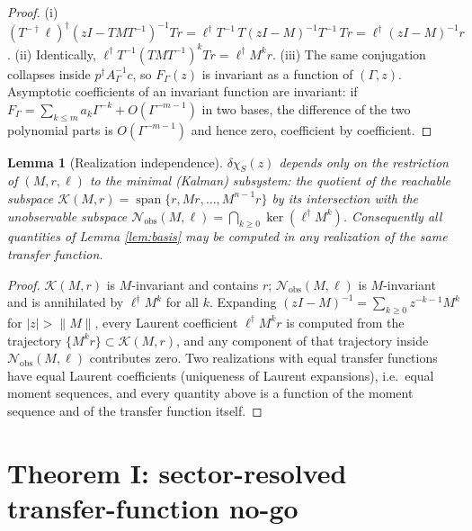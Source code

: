 \documentclass[11pt]{article}
\newtheorem{lemma}{Lemma}
\newcommand{\spann}{\operatorname{span}}
\newcommand{\kry}{\mathcal K}
\newcommand{\nobs}{\mathcal N_{\mathrm{obs}}}
\begin{document}
\begin{proof}
(i) $(T^{-\dagger}\ell)^\dagger(zI-TMT^{-1})^{-1}Tr
=\ell^\dagger T^{-1}\,T(zI-M)^{-1}T^{-1}\,Tr=\ell^\dagger(zI-M)^{-1}r$.
(ii) Identically, $\ell^\dagger T^{-1}(TMT^{-1})^kTr=\ell^\dagger M^kr$.
(iii) The same conjugation collapses inside
$p^\dagger A_\Gamma^{-1}c$, so $F_\Gamma(z)$ is invariant as a function of
$(\Gamma,z)$. Asymptotic coefficients of an invariant function are invariant:
if $F_\Gamma=\sum_{k\le m}a_k\Gamma^{-k}+O(\Gamma^{-m-1})$ in two bases, the
difference of the two polynomial parts is $O(\Gamma^{-m-1})$ and hence zero,
coefficient by coefficient.
\end{proof}

\begin{lemma}[Realization independence]
\label{lem:kalman}
$\delta\chi_S(z)$ depends only on the restriction of $(M,r,\ell)$ to the
\emph{minimal} (Kalman) subsystem: the quotient of the reachable subspace
$\kry(M,r)=\spann\{r,Mr,\dots,M^{n-1}r\}$ by its intersection with the
unobservable subspace $\nobs(M,\ell)=\bigcap_{k\ge0}\ker(\ell^\dagger M^k)$.
Consequently all quantities of Lemma \ref{lem:basis} may be computed in any
realization of the same transfer function.
\end{lemma}

\begin{proof}
$\kry(M,r)$ is $M$-invariant and contains $r$; $\nobs(M,\ell)$ is
$M$-invariant and is annihilated by $\ell^\dagger M^k$ for all $k$. Expanding
$(zI-M)^{-1}=\sum_{k\ge0}z^{-k-1}M^k$ for $|z|>\|M\|$, every Laurent
coefficient $\ell^\dagger M^kr$ is computed from the trajectory
$\{M^kr\}\subset\kry(M,r)$, and any component of that trajectory inside
$\nobs(M,\ell)$ contributes zero. Two realizations with equal transfer
functions have equal Laurent coefficients (uniqueness of Laurent expansions),
i.e.\ equal moment sequences, and every quantity above is a function of the
moment sequence and of the transfer function itself.
\end{proof}

\section{Theorem I: sector-resolved transfer-function no-go}
\end{document}
